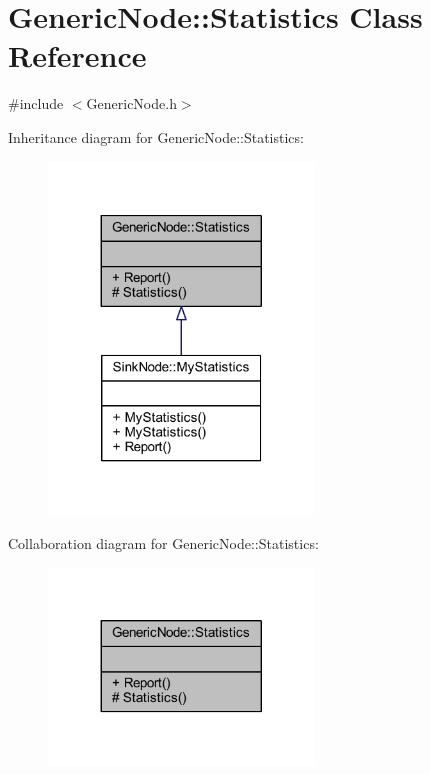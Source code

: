 \hypertarget{class_generic_node_1_1_statistics}{}\section{Generic\+Node\+:\+:Statistics Class Reference}
\label{class_generic_node_1_1_statistics}


{\ttfamily \#include $<$Generic\+Node.\+h$>$}



Inheritance diagram for Generic\+Node\+:\+:Statistics\+:\nopagebreak
\begin{figure}[H]
\begin{center}
\leavevmode
\includegraphics[width=200pt]{class_generic_node_1_1_statistics__inherit__graph}
\end{center}
\end{figure}


Collaboration diagram for Generic\+Node\+:\+:Statistics\+:\nopagebreak
\begin{figure}[H]
\begin{center}
\leavevmode
\includegraphics[width=200pt]{class_generic_node_1_1_statistics__coll__graph}
\end{center}
\end{figure}
